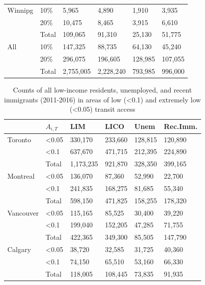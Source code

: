 \documentclass[11 pt, letterpaper]{article}
\begin{document}
{\begin{table}[H]
\begin{tabular}{ll|llll}
		Winnipg     & 10\%  & 5,965     & 4,890     & 1,910   & 3,935   \\
		& 20\%  & 10,475    & 8,465     & 3,915   & 6,610   \\
		& Total & 109,065   & 91,310    & 25,130  & 51,775  \\ \hline
		All         & 10\%  & 147,325   & 88,735    & 64,130  & 45,240  \\
		& 20\%  & 296,075   & 196,605   & 128,985 & 107,055 \\
		& Total & 2,755,005 & 2,228,240 & 793,985 & 996,000
	\end{tabular}
\end{table}
\newpage


\begin{table}[H]
	\vspace{2mm}
	\centering
	\renewcommand{\arraystretch}{0.75} %
	\caption{Counts of all low-income residents, unemployed, and recent immigrants (2011-2016) in areas of low (\textless 0.1) and extremely low (\textless 0.05) transit access}
	\label{tab_lowacc}
	\begin{tabular}{ll|llll}
	& $A_{i,T}$         & LIM            & LICO      & Unem      & Rec.Imm.         \\ \hline
	Toronto     & \textless 0.05 & 330,170   & 233,660   & 128,815  & 120,890 \\
	& \textless 0.1  & 637,670   & 471,715   & 212,395  & 224,890 \\
	& Total          & 1,173,235 & 921,870   & 328,350  & 399,165 \\ \hline
	Montreal    & \textless 0.05 & 136,070   & 87,360    & 52,990   & 22,700  \\
	& \textless 0.1  & 241,835   & 168,275   & 81,685   & 55,340  \\
	& Total          & 598,150   & 471,825   & 158,255  & 178,320 \\ \hline
	Vancouver   & \textless 0.05 & 115,165   & 85,525    & 30,400   & 39,220  \\
	& \textless 0.1  & 199,040   & 152,205   & 47,285   & 71,755  \\
	& Total          & 422,365   & 349,300   & 85,505   & 147,790 \\ \hline
	Calgary     & \textless 0.05 & 38,720    & 32,585    & 31,725   & 40,360  \\
	& \textless 0.1  & 74,150    & 65,510    & 53,160   & 66,330  \\
	& Total          & 118,005   & 108,445   & 73,835   & 91,935  \\ \hline

\end{tabular}
\end{table}}
\end{document}
